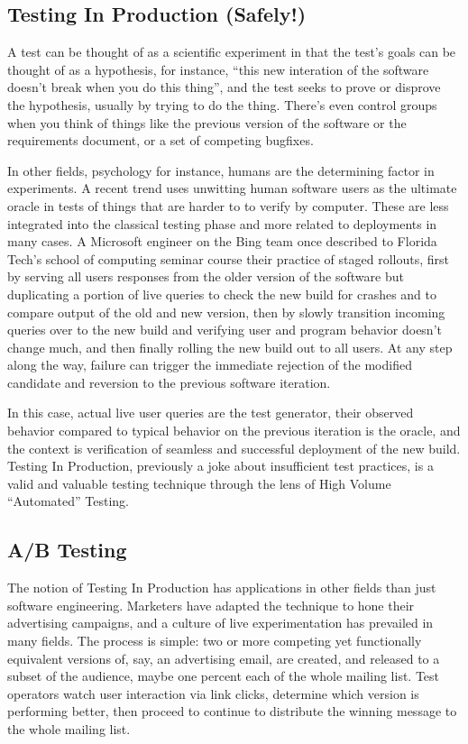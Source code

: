 \subsection{Testing In Production (Safely!)}
A test can be thought of as a scientific experiment in that the test's goals can be thought of as a hypothesis, for instance, ``this new interation of the software doesn't break when you do this thing'', and the test seeks to prove or disprove the hypothesis, usually by trying to do the thing. There's even control groups when you think of things like the previous version of the software or the requirements document, or a set of competing bugfixes.

In other fields, psychology for instance, humans are the determining factor in experiments. A recent trend uses unwitting human software users as the ultimate oracle in tests of things that are harder to to verify by computer. These are less integrated into the classical testing phase and more related to deployments in many cases. A Microsoft engineer on the Bing team once described to Florida Tech's school of computing seminar course their practice of staged rollouts, first by serving all users responses from the older version of the software but duplicating a portion of live queries to check the new build for crashes and to compare output of the old and new version, then by slowly transition incoming queries over to the new build and verifying user and program behavior doesn't change much, and then finally rolling the new build out to all users. At any step along the way, failure can trigger the immediate rejection of the modified candidate and reversion to the previous software iteration.

In this case, actual live user queries are the test generator, their observed behavior compared to typical behavior on the previous iteration is the oracle, and the context is verification of seamless and successful deployment of the new build. Testing In Production, previously a joke about insufficient test practices, is a valid and valuable testing technique through the lens of High Volume ``Automated'' Testing.

\subsection{A/B Testing}
The notion of Testing In Production has applications in other fields than just software engineering. Marketers have adapted the technique to hone their advertising campaigns, and a culture of live experimentation has prevailed in many fields. The process is simple: two or more competing yet functionally equivalent versions of, say, an advertising email, are created, and released to a subset of the audience, maybe one percent each of the whole mailing list. Test operators watch user interaction via link clicks, determine which version is performing better, then proceed to continue to distribute the winning message to the whole mailing list.

